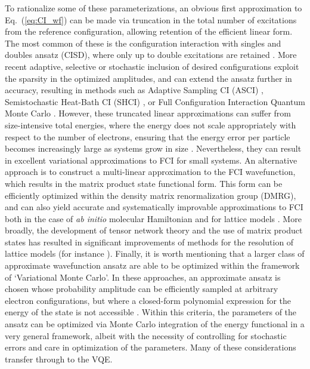 To rationalize some of these parameterizations, an obvious first approximation to Eq.~(\ref{eq:CI_wf}) can be made via truncation in the total number of excitations from the reference configuration, allowing retention of the efficient linear form. The most common of these is the configuration interaction with singles and doubles ansatz (CISD), where only up to double excitations are retained \cite{Szabo1996}. More recent adaptive, selective or stochastic inclusion of desired configurations exploit the sparsity in the optimized amplitudes, and can extend the ansatz further in accuracy, resulting in methods such as Adaptive Sampling CI (ASCI) \cite{Tubman2016, Tubman2020, Hait2019, Levine2020}, Semistochastic Heat-Bath CI (SHCI) \cite{Petruzielo2012, Holmes2016, Holmes2016_2, Sharma2017, Smith2017, Holmes2017, Li2018}, or Full Configuration Interaction Quantum Monte Carlo \cite{Booth2010, Cleland2012, Anderson2020, Booth2011, Blunt2019}. However, these truncated linear approximations can suffer from size-intensive total energies, where the energy does not scale appropriately with respect to the number of electrons, ensuring that the energy error per particle becomes increasingly large as systems grow in size \cite{Szabo1996}. Nevertheless, they can result in excellent variational approximations to FCI for small systems. An alternative approach is to construct a multi-linear approximation to the FCI wavefunction, which results in the matrix product state functional form. This form can be efficiently optimized within the density matrix renormalization group (DMRG), and can also yield accurate and systematically improvable approximations to FCI both in the case of \textit{ab initio} molecular Hamiltonian and for lattice models \cite{White1992, White1993, White1999, Mitrushenkov2001, Legeza2003, Chan2002, Chan2011, Sharma2012, OlivaresAmaya2015, Wouters2014, Yanai2014, Knecht2016}. More broadly, the development of tensor network theory \cite{Biamonte2017, Ors2019} and the use of matrix product states has resulted in significant improvements of methods for the resolution of lattice models (for instance \cite{Schneider2021, Kaneko2022}). Finally, it is worth mentioning that a larger class of approximate wavefunction ansatz are able to be optimized within the framework of `Variational Monte Carlo'. In these approaches, an approximate ansatz is chosen whose probability amplitude can be efficiently sampled at arbitrary electron configurations, but where a closed-form polynomial expression for the energy of the state is not accessible \cite{TOULOUSE2016285,Needs2020,Pfau2020}. Within this criteria, the parameters of the ansatz can be optimized via Monte Carlo integration of the energy functional in a very general framework, albeit with the necessity of controlling for stochastic errors and care in optimization of the parameters. Many of these considerations transfer through to the VQE.

